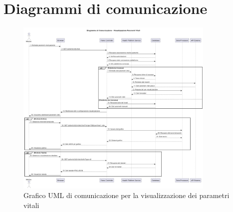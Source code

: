 \documentclass[12pt,a4paper,oneside]{report}
\begin{document}
\section{Diagrammi di comunicazione}
\begin{figure}[H]
    \centering
    \includegraphics[width=0.85\textwidth]{images/uml/VitalSignsVisualization.png}
    \caption{Grafico UML di comunicazione per la visualizzazione dei parametri vitali}
    \label{fig:uml-com-vit-graph}
\end{figure}
\end{document}
